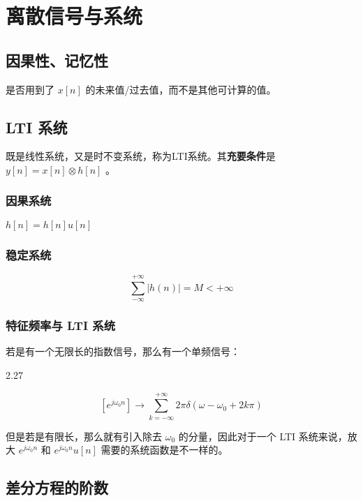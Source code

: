 \documentclass[cn,11pt,chinese,black,simple]{elegantbook}
\begin{document}
\fi 
\def\chapname{review}




\chapter{离散信号与系统}

\section{因果性、记忆性}

是否用到了 \(x[n]\) 的未来值/过去值，而不是其他可计算的值。

\section{LTI 系统}

既是线性系统，又是时不变系统，称为LTI系统。其\textbf{充要条件}是 \(y[n] = x[n] \otimes h[n]\) 。

\subsection{因果系统}

\(h[n] = h[n] u[n]\) 

\subsection{稳定系统}

\[
\sum_{-\infty}^{+\infty} |h(n)| =M<+\infty
\]

\subsection{特征频率与 LTI 系统}

若是有一个无限长的指数信号，那么有一个单频信号：

2.27

\[
    \left[e^{j \omega_{0} n}\right]\rightarrow \sum_{k=-\infty}^{+\infty} 2 \pi \delta\left(\omega-\omega_{0}+2 k \pi\right)
\]

但是若是有限长，那么就有引入除去 \(\omega_0\) 的分量，因此对于一个 LTI 系统来说，放大 \(e^{j \omega_0 n}\) 和 \(e^{j \omega_0 n} u[n]\) 需要的系统函数是不一样的。

\section{差分方程的阶数}
\end{document}
